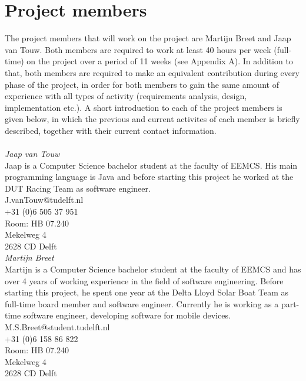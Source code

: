 \section{Project members}
The project members that will work on the project are Martijn Breet and Jaap van Touw. Both members are required to work at least 40 hours per week (full-time) on the project over a period of 11 weeks (see Appendix A). In addition to that, both members are required to make an equivalent contribution during every phase of the project, in order for both members to gain the same amount of experience with all types of activity (requirements analysis, design, implementation etc.). A short introduction to each of the project members is given below, in which the previous and current activites of each member is briefly described, together with their current contact information.\\
\noindent\\
\textit{Jaap van Touw}\\
Jaap is a Computer Science bachelor student at the faculty of EEMCS. His main programming language is Java and before starting this project he worked at the DUT Racing Team as software engineer.\\

\noindent
J.vanTouw@tudelft.nl\\
+31 (0)6 505 37 951\\
Room: HB 07.240\\
Mekelweg 4\\
2628 CD Delft\\

\noindent
\textit{Martijn Breet}\\
Martijn is a Computer Science bachelor student at the faculty of EEMCS and has over 4 years of working experience in the field of software engineering.  Before starting this project, he spent one year at the Delta Lloyd Solar Boat Team as full-time board member and software engineer. Currently he is working as a part-time software engineer, developing software for mobile devices.\\

\noindent
M.S.Breet@student.tudelft.nl \\
+31 (0)6 158 86 822\\
Room: HB 07.240\\
Mekelweg 4\\
2628 CD Delft\\